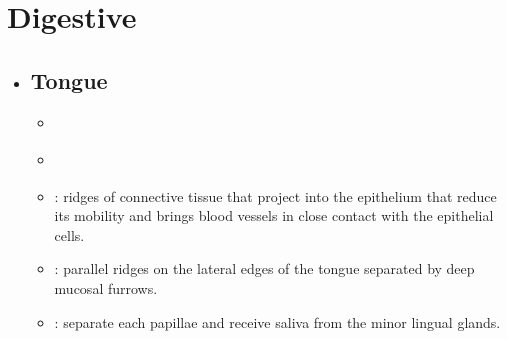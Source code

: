\newpage
\section{Digestive}\label{Digestive}
\begin{itemize}
  \item {}
  
  

  \subsection{Tongue}\label{Tongue}
  \begin{multicols}{2}
  \begin{itemize}
    \item {}
    
    \begin{center}
    \end{center}
    
    \item {}
    
    \begin{center}
    \end{center}

    \item {}: ridges of connective tissue that project into the epithelium that reduce its mobility and brings blood vessels in close contact with the epithelial cells. 
    
    \begin{center}
    \end{center}
    
    \item {}: parallel ridges on the lateral edges of the tongue separated by deep mucosal furrows.
    
    \begin{center}
    \end{center}

    \item {}: separate each papillae and receive saliva from the minor lingual glands.
    
    \begin{center}
    \end{center}
    

\end{itemize}
\end{multicols}
\end{itemize}
